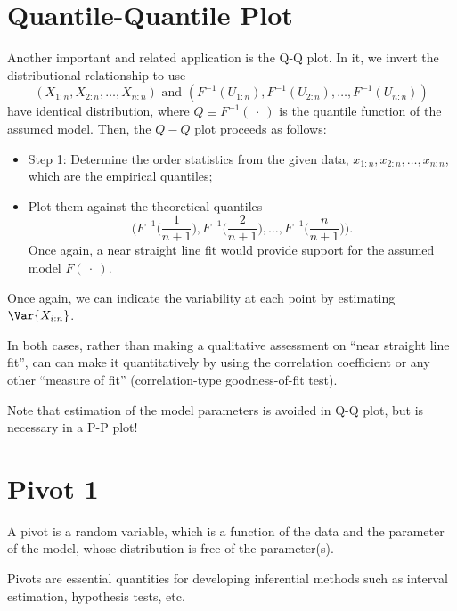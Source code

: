 \section*{Quantile-Quantile Plot}
Another important and related application is the Q-Q plot.
In it, we invert the distributional relationship to use
\[ (X_{1:n},X_{2:n},\ldots,X_{n:n})\text{ and }
    (F^{-1}(U_{1:n}),F^{-1}(U_{2:n}),\ldots,
    F^{-1}(U_{n:n})) \]
have identical distribution, where $ Q\equiv F^{-1}(\:\cdot\:) $
is the quantile function of the assumed model. Then,
the $ Q-Q $ plot proceeds as follows:
\begin{itemize}
    \item Step 1: Determine the order statistics from the given data,
          $ x_{1:n},x_{2:n},\ldots,x_{n:n} $, which are the empirical quantiles;
    \item Plot them against the theoretical quantiles
          \[ \biggl(F^{-1}\biggl(\frac{1}{n+1}\biggr),F^{-1}\biggl(\frac{2}{n+1}\biggr),\ldots,
              F^{-1}\biggl(\frac{n}{n+1}\biggr)\biggr). \]
          Once again, a near straight line fit would provide support for the assumed
          model $ F(\:\cdot\:) $.
\end{itemize}
\begin{Remark}{}{}
    Once again, we can indicate the variability at each point by estimating
    $ \Var{X_{i:n}} $.
\end{Remark}
\begin{Remark}{}{}
    In both cases, rather than making a qualitative assessment on
    ``near straight line fit'', can can make it quantitatively
    by using the correlation coefficient or any other
    ``measure of fit'' (correlation-type goodness-of-fit test).
\end{Remark}
\begin{Remark}{}{}
    Note that estimation of the model parameters is avoided in Q-Q plot,
    but is necessary in a P-P plot!
\end{Remark}
\section*{Pivot 1}
A pivot is a random variable, which is a function of the data
and the parameter of the model, whose distribution is free of the parameter(s).

Pivots are essential quantities for developing inferential methods such as
interval estimation, hypothesis tests, etc.

